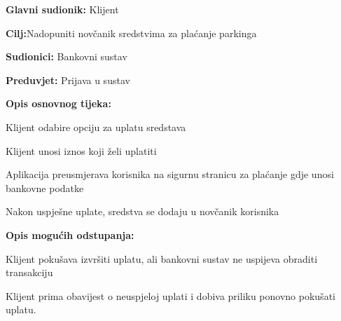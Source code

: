 \noindent {}
\begin{packed_item}
	
	\item \textbf{Glavni sudionik: }Klijent
	\item  \textbf{Cilj:}Nadopuniti novčanik sredstvima za plaćanje parkinga
	\item  \textbf{Sudionici:} Bankovni sustav
	\item  \textbf{Preduvjet:} Prijava u sustav
	\item  \textbf{Opis osnovnog tijeka:}
	
	\item[] \begin{packed_enum}
		
		\item Klijent odabire opciju za uplatu sredstava
		\item Klijent unosi iznos koji želi uplatiti
		\item Aplikacija preusmjerava korisnika na sigurnu stranicu za plaćanje gdje unosi bankovne podatke
		\item Nakon uspješne uplate, sredstva se dodaju u novčanik korisnika
		
	\end{packed_enum}
	
	\item  \textbf{Opis mogućih odstupanja:}
	\item[] \begin{packed_item}
		
		\item[3.a] Klijent pokušava izvršiti uplatu, ali bankovni sustav ne uspijeva obraditi transakciju
		\item[] \begin{packed_enum}
			
			\item Klijent prima obavijest o neuspjeloj uplati i dobiva priliku ponovno pokušati uplatu.
			
		\end{packed_enum}
		
	\end{packed_item}
	
\end{packed_item}

